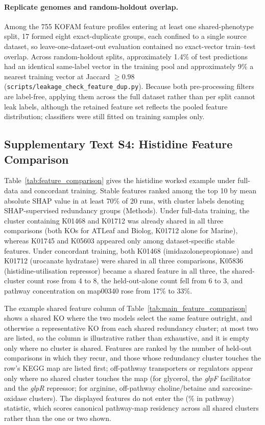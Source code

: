 \paragraph*{Replicate genomes and random-holdout overlap.}
Among the 755 KOFAM feature profiles entering at least one shared-phenotype split, 17 formed eight exact-duplicate groups, each confined to a single source dataset, so leave-one-dataset-out evaluation contained no exact-vector train--test overlap.
Across random-holdout splits, approximately 1.4\% of test predictions had an identical same-label vector in the training pool and approximately 9\% a nearest training vector at Jaccard $\geq 0.98$ (\texttt{scripts/leakage\_check\_feature\_dup.py}).
Because both pre-processing filters are label-free, applying them across the full dataset rather than per split cannot leak labels, although the retained feature set reflects the pooled feature distribution; classifiers were still fitted on training samples only.

\subsection*{Supplementary Text S4: Histidine Feature Comparison}

Table~\ref{tab:feature_comparison} gives the histidine worked example under full-data and concordant training.
Stable features ranked among the top 10 by mean absolute SHAP value in at least 70\% of 20 runs, with cluster labels denoting SHAP-supervised redundancy groups (Methods).
Under full-data training, the cluster containing K01468 and K01712 was already shared in all three comparisons (both KOs for ATLeaf and Biolog, K01712 alone for Marine), whereas K01745 and K05603 appeared only among dataset-specific stable features.
Under concordant training, both K01468 (imidazolonepropionase) and K01712 (urocanate hydratase) were shared in all three comparisons, K05836 (histidine-utilisation repressor) became a shared feature in all three, the shared-cluster count rose from 4 to 8, the held-out-alone count fell from 6 to 3, and pathway concentration on map00340 rose from 17\% to 33\%.


The example shared feature column of Table~\ref{tab:main_feature_comparison} shows a shared KO where the two models select the same feature outright, and otherwise a representative KO from each shared redundancy cluster; at most two are listed, so the column is illustrative rather than exhaustive, and it is empty only where no cluster is shared.
Features are ranked by the number of held-out comparisons in which they recur, and those whose redundancy cluster touches the row's KEGG map are listed first; off-pathway transporters or regulators appear only where no shared cluster touches the map (for glycerol, the \emph{glpF} facilitator and the \emph{glpR} repressor; for arginine, off-pathway choline/betaine and sarcosine-oxidase clusters).
The displayed features do not enter the (\% in pathway) statistic, which scores canonical pathway-map residency across all shared clusters rather than the one or two shown.


